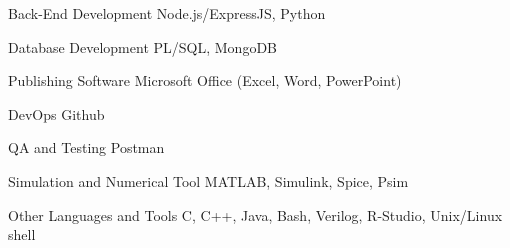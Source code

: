 \newcommand{\Csh}{C{\lserif\#}}



\begin{cvskills}






\cvskill
{Back-End Development} %
{Node.js/ExpressJS, Python} %


\cvskill
{Database Development} %
{PL/SQL, MongoDB} %


\cvskill
{Publishing Software} %
{Microsoft Office (Excel, Word, PowerPoint)} %


\cvskill
{DevOps} %
{Github} %


\cvskill
{QA and Testing} %
{Postman} %


\cvskill
{Simulation and Numerical Tool} %
{MATLAB, Simulink, Spice, Psim} %


\cvskill
{Other Languages and Tools} %
{C, C++, Java, Bash, Verilog, R-Studio, Unix/Linux shell} %


\end{cvskills}